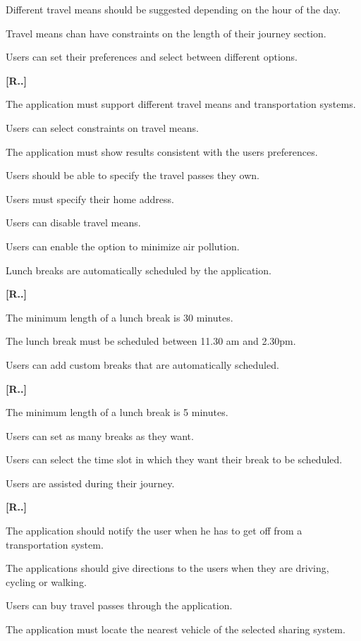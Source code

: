 \begin{list}
\begin{list}
\item Different travel means should be suggested depending on the hour of the day.
\item Travel means chan have constraints on the length of their journey section.
\end{list}
\item Users can set their preferences and select between different options.
\begin{list}
	{\bfseries{}[R..]~}
	{
	}
\item The application must support different travel means and transportation systems.
\item Users can select constraints on travel means.
\item The application must show results consistent with the users preferences.
\item Users should be able to specify the travel passes they own.
\item Users must specify their home address.
	\item Users can disable travel means.
	\item Users can enable the option to minimize air pollution.
    \end{list}
\item Lunch breaks are automatically scheduled by the application.
\begin{list}
	{\bfseries{}[R..]~}
	{
	}
\item The minimum length of a lunch break is 30 minutes.
\item The lunch break must be scheduled between 11.30 am and 2.30pm.
\end{list}
\item Users can add custom breaks that are automatically scheduled.
\begin{list}
	{\bfseries{}[R..]~}
	{
	}
\item The minimum length of a lunch break is 5 minutes.
\item Users can set as many breaks as they want.
\item Users can select the time slot in which they want their break to be scheduled.
\end{list}
\item Users are assisted during their journey.
\begin{list}
	{\bfseries{}[R..]~}
	{
	}
\item The application should notify the user when he has to get off from a transportation system.
\item The applications should give directions to the users when they are driving, cycling or walking.
\item Users can buy travel passes through the application.
\item The application must locate the nearest vehicle of the selected sharing system.
\end{list}


\end{list}

